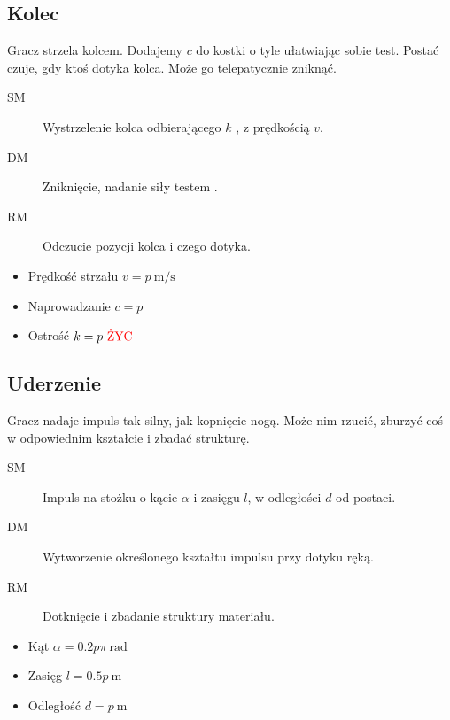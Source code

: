 \subsection{Kolec}
Gracz strzela kolcem.
Dodajemy $c$ do kostki o tyle ułatwiając sobie test.
Postać czuje, gdy ktoś dotyka kolca.
Może go telepatycznie zniknąć.
\begin{description}
	\item[SM] Wystrzelenie kolca odbierającego $k$ \abzyc{}, z prędkością $v$.
	\item[DM] Zniknięcie, nadanie siły testem \abs{}.
	\item[RM] Odczucie pozycji kolca i czego dotyka.
\end{description}
\begin{itemize}
	\item Prędkość strzału $v = p \ \si{\metre\per\second}$
	\item Naprowadzanie $c = p$
	\item Ostrość $k = p \ \text{\abzyc{}}$
\end{itemize}

\subsection{Uderzenie}
Gracz nadaje impuls tak silny, jak kopnięcie nogą.
Może nim rzucić, zburzyć coś w odpowiednim kształcie i zbadać strukturę.
\begin{description}
	\item[SM] Impuls na stożku o kącie $\alpha$ i zasięgu $l$, w odległości $d$ od postaci.
	\item[DM] Wytworzenie określonego kształtu impulsu przy dotyku ręką.
	\item[RM] Dotknięcie i zbadanie struktury materiału.
\end{description}
\begin{itemize}
	\item Kąt $\alpha = 0.2p\pi \ \si{\radian}$
	\item Zasięg $l = 0.5p \ \si{\meter}$
	\item Odległość $d = p \ \si{\meter}$
\end{itemize}

